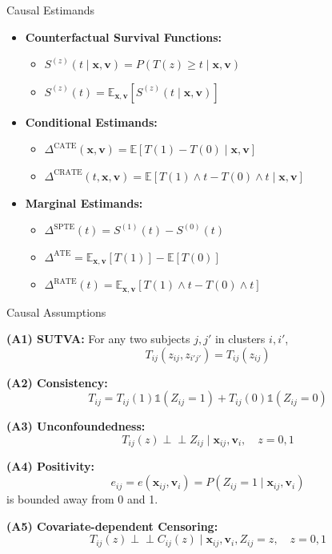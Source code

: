 \documentclass{beamer}
\begin{document}
\begin{frame}{Causal Estimands}
\begin{itemize}
  \vfill \item \textbf{Counterfactual Survival Functions:}
\begin{itemize}
    \vfill \item \( S^{(z)}(t \mid \mathbf{x}, \mathbf{v}) = P(T(z) \ge t \mid \mathbf{x}, \mathbf{v}) \)
    \vfill \item \( S^{(z)}(t) = \mathbb{E}_{\mathbf{x}, \mathbf{v}}[S^{(z)}(t \mid \mathbf{x}, \mathbf{v})] \)
  \end{itemize}
  \vspace{6pt}
  \vfill \item \textbf{Conditional Estimands:}
  \begin{itemize}
   \vfill \item \( \Delta^{\text{CATE}}(\mathbf{x}, \mathbf{v}) = \mathbb{E}[T(1) - T(0) \mid \mathbf{x}, \mathbf{v}] \)
    \vfill \item \( \Delta^{\text{CRATE}}(t,\mathbf{x}, \mathbf{v}) = \mathbb{E}[T(1) \wedge t - T(0) \wedge t \mid \mathbf{x}, \mathbf{v}] \)
    \end{itemize}
    \vspace{6pt}
  \vfill \item \textbf{Marginal Estimands:}
  \begin{itemize}
    \vfill \item  \( \Delta^{\text{SPTE}}(t) = S^{(1)}(t) - S^{(0)}(t) \)
    \vfill \item  \( \Delta^{\text{ATE}} = \mathbb{E}_{\mathbf{x},\mathbf{v}}[T(1)] - \mathbb{E}[T(0)] \)
    \vfill \item  \( \Delta^{\text{RATE}}(t) = \mathbb{E}_{\mathbf{x}, \mathbf{v}}[T(1) \wedge t - T(0) \wedge t] \)
\end{itemize}
\end{itemize}
\end{frame}
\begin{frame}{Causal Assumptions}
    \item \textbf{(A1) SUTVA:} For any two subjects \( j, j' \) in clusters \( i, i' \),
    \[
    T_{ij}(z_{ij}, z_{i'j'}) = T_{ij}(z_{ij})
    \]
    \item \textbf{(A2) Consistency:}
    \[
    T_{ij} = T_{ij}(1)\mathds{1}(Z_{ij}=1) + T_{ij}(0)\mathds{1}(Z_{ij}=0)
    \]
    \item \textbf{(A3) Unconfoundedness:}
    \[
    T_{ij}(z) \perp\!\!\!\perp Z_{ij} \mid \mathbf{x}_{ij}, \mathbf{v}_i, \quad z=0,1
    \]
    \item \textbf{(A4) Positivity:}
    \[
   e_{ij}= e(\mathbf{x}_{ij}, \mathbf{v}_i) = P(Z_{ij}=1 \mid \mathbf{x}_{ij}, \mathbf{v}_i)
    \]
    is bounded away from 0 and 1.
    \item \textbf{(A5) Covariate-dependent Censoring:}
    \[
    T_{ij}(z) \perp\!\!\!\perp C_{ij}(z) \mid \mathbf{x}_{ij}, \mathbf{v}_i, Z_{ij}=z, \quad z=0,1
    \]
\end{frame} 
\end{document}
